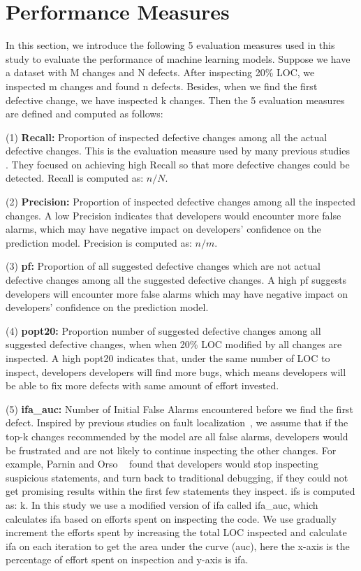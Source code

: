 \documentclass[10pt,journal,compsoc]{IEEEtran}
\begin{document}
\section{Performance Measures}
\label{sec:Measures}

In this section, we introduce the following 5 evaluation measures used in this study to evaluate the performance of machine learning models. Suppose we have a dataset with M changes and N defects. After inspecting 20\% LOC, we inspected m changes and found n defects. Besides, when we find the first defective change, we have inspected k changes. Then the 5 evaluation measures are defined and computed as follows:

(1) \textbf{Recall:} Proportion of inspected defective changes among all the actual defective changes. This is the evaluation measure used by many previous studies~\cite{kamei2012large,yang2016effort,yang2017tlel,xia2016collective,yang2015deep} . They focused on achieving high Recall so that more defective changes could be detected. Recall is computed as: $n/N$.

(2) \textbf{Precision:} Proportion of inspected defective changes among all the inspected changes. A low Precision indicates that developers would encounter more false alarms, which may have negative impact on developers' confidence on the prediction model. Precision is computed as: $n/m$.

(3) \textbf{pf:} Proportion of all suggested defective changes which are not actual defective changes among all the suggested defective changes. A high pf suggests developers will encounter more false alarms which may have negative impact on developers' confidence on the prediction model.

(4) \textbf{popt20:} Proportion number of suggested defective changes among all suggested defective changes, when when 20\% LOC modified by all changes are inspected. A high popt20 indicates that, under the same number of LOC to inspect, developers developers will find more bugs, which means developers will be able to fix more defects with same amount of effort invested.

(5) \textbf{ifa\_auc:} Number of Initial False Alarms encountered before we find the first defect. Inspired by previous studies on fault localization~\cite{parnin2011automated,kochhar2016practitioners,xia2016automated}, we assume that if the top-k changes recommended by the model are all false alarms, developers would be frustrated and are not likely to continue inspecting the other changes. For example, Parnin and Orso ~\cite{parnin2011automated} found that developers would stop inspecting suspicious statements, and turn back to traditional debugging, if they could not get promising results within the first few statements they inspect. ifs is computed as: k. In this study we use a modified version of ifa called ifa\_auc, which calculates ifa based on efforts spent on inspecting the code. We use gradually increment the efforts spent by increasing the total LOC inspected and calculate ifa on each iteration to get the area under the curve (auc), here the x-axis is the percentage of effort spent on inspection and y-axis is ifa.
\end{document}
